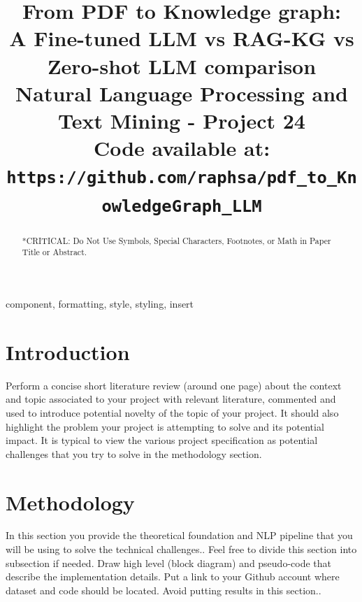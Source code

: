 \documentclass[conference]{IEEEtran}
\begin{document}
\title{From PDF to Knowledge graph:\\ A Fine-tuned LLM vs RAG-KG vs Zero-shot LLM comparison \\
{\footnotesize Natural Language Processing and Text Mining - Project 24} \\
{\small \textbf{Code available at:} \texttt{https://github.com/raphsa/pdf\_to\_KnowledgeGraph\_LLM}}
}

\author{
\and
{}
\and
{}
}

\maketitle

\begin{abstract}
*CRITICAL: Do Not Use Symbols, Special Characters, Footnotes, 
or Math in Paper Title or Abstract.
\end{abstract}

\begin{IEEEkeywords}
component, formatting, style, styling, insert
\end{IEEEkeywords}

\section{Introduction}
Perform a concise short literature review (around one page) about the context and topic associated to your project with relevant literature, commented and used to introduce potential novelty of the topic of your project. It should also highlight the problem your project is attempting to solve and its potential impact. It is typical to view the various project specification as potential challenges that you try to solve in the methodology section. 

\section{Methodology}
In this section you provide the theoretical foundation and NLP pipeline that you will be using to solve the technical challenges.. Feel free to divide this section into subsection if needed. Draw high level (block diagram) and pseudo-code that describe the implementation details. Put a link to your Github account where dataset and code should be located. 
Avoid putting results in this section..
\end{document}
